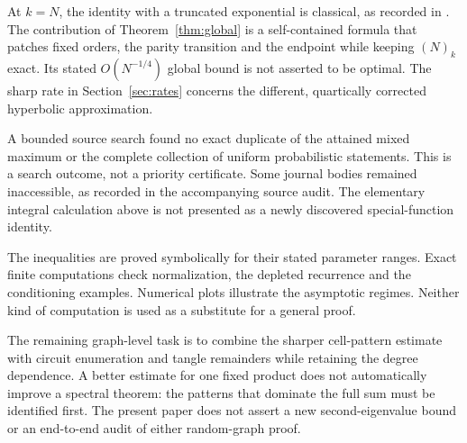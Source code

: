 At $k=N$, the identity with a truncated exponential is classical, as recorded in \cite[Section 1]{DMO}. The contribution of Theorem~\ref{thm:global} is a self-contained formula that patches fixed orders, the parity transition and the endpoint while keeping $(N)_k$ exact. Its stated $O(N^{-1/4})$ global bound is not asserted to be optimal. The sharp rate in Section~\ref{sec:rates} concerns the different, quartically corrected hyperbolic approximation.

A bounded source search found no exact duplicate of the attained mixed maximum or the complete collection of uniform probabilistic statements. This is a search outcome, not a priority certificate. Some journal bodies remained inaccessible, as recorded in the accompanying source audit. The elementary integral calculation above is not presented as a newly discovered special-function identity.

The inequalities are proved symbolically for their stated parameter ranges. Exact finite computations check normalization, the depleted recurrence and the conditioning examples. Numerical plots illustrate the asymptotic regimes. Neither kind of computation is used as a substitute for a general proof.

The remaining graph-level task is to combine the sharper cell-pattern estimate with circuit enumeration and tangle remainders while retaining the degree dependence. A better estimate for one fixed product does not automatically improve a spectral theorem: the patterns that dominate the full sum must be identified first. The present paper does not assert a new second-eigenvalue bound or an end-to-end audit of either random-graph proof.
